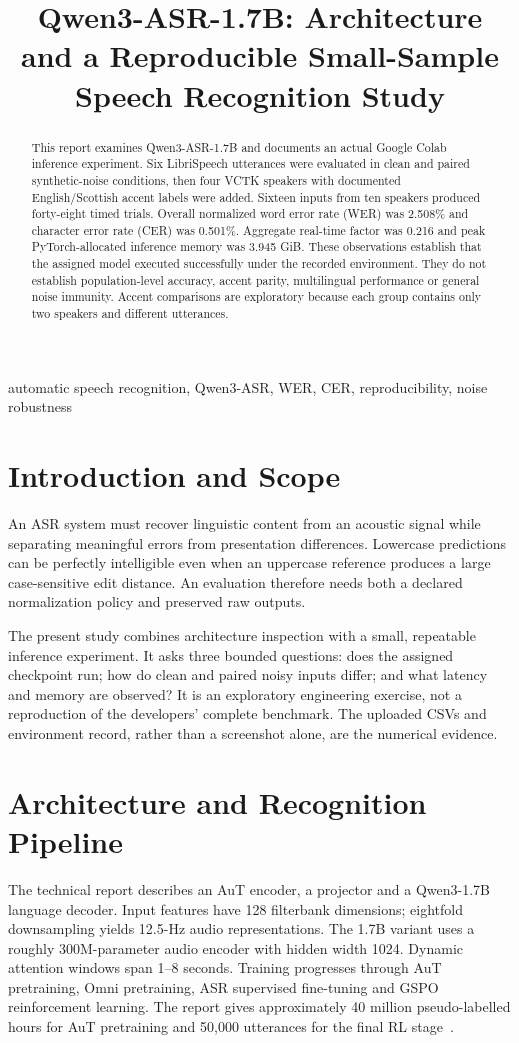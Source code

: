 \documentclass[conference]{IEEEtran}
\title{Qwen3-ASR-1.7B: Architecture and a Reproducible Small-Sample Speech Recognition Study}
\author{\IEEEauthorblockN{Alaa Boghdady}\IEEEauthorblockA{Cellula AI Internship -- Week 8, Task 2\\Experimental evaluation with recorded Colab results}}
\begin{document}
\maketitle
\begin{abstract}
This report examines Qwen3-ASR-1.7B and documents an actual Google Colab inference experiment. Six LibriSpeech utterances were evaluated in clean and paired synthetic-noise conditions, then four VCTK speakers with documented English/Scottish accent labels were added. Sixteen inputs from ten speakers produced forty-eight timed trials. Overall normalized word error rate (WER) was 2.508\% and character error rate (CER) was 0.501\%. Aggregate real-time factor was 0.216 and peak PyTorch-allocated inference memory was 3.945 GiB. These observations establish that the assigned model executed successfully under the recorded environment. They do not establish population-level accuracy, accent parity, multilingual performance or general noise immunity. Accent comparisons are exploratory because each group contains only two speakers and different utterances.
\end{abstract}
\begin{IEEEkeywords}
automatic speech recognition, Qwen3-ASR, WER, CER, reproducibility, noise robustness
\end{IEEEkeywords}
\section{Introduction and Scope}
An ASR system must recover linguistic content from an acoustic signal while separating meaningful errors from presentation differences. Lowercase predictions can be perfectly intelligible even when an uppercase reference produces a large case-sensitive edit distance. An evaluation therefore needs both a declared normalization policy and preserved raw outputs.

The present study combines architecture inspection with a small, repeatable inference experiment. It asks three bounded questions: does the assigned checkpoint run; how do clean and paired noisy inputs differ; and what latency and memory are observed? It is an exploratory engineering exercise, not a reproduction of the developers' complete benchmark. The uploaded CSVs and environment record, rather than a screenshot alone, are the numerical evidence.

\section{Architecture and Recognition Pipeline}
The technical report describes an AuT encoder, a projector and a Qwen3-1.7B language decoder. Input features have 128 filterbank dimensions; eightfold downsampling yields 12.5-Hz audio representations. The 1.7B variant uses a roughly 300M-parameter audio encoder with hidden width 1024. Dynamic attention windows span 1--8 seconds. Training progresses through AuT pretraining, Omni pretraining, ASR supervised fine-tuning and GSPO reinforcement learning. The report gives approximately 40 million pseudo-labelled hours for AuT pretraining and 50,000 utterances for the final RL stage~\cite{qwenreport}.
\end{document}
